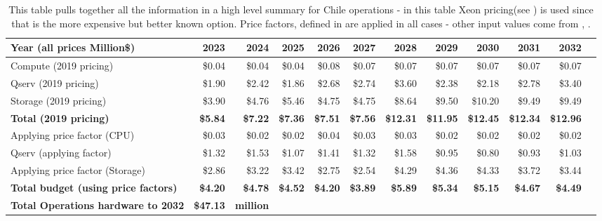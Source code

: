 \tiny \begin{longtable} { |p{}  |r  |r  |r  |r  |r  |r  |r  |r  |r  |r  |r |} 
\caption{This table pulls together all the information in a high level summary for Chile operations - in this table Xeon pricing(see ) is used since that is the more expensive but better known option. Price factors, defined in  are applied in all cases - other input values come from , .
 \label{tab:opsSumChile}}\\ 
\hline 
\textbf{Year  (all prices Million\$)}&\textbf{2023}&\textbf{2024}&\textbf{2025}&\textbf{2026}&\textbf{2027}&\textbf{2028}&\textbf{2029}&\textbf{2030}&\textbf{2031}&\textbf{2032} \\ \hline
{Compute (2019 pricing)}&{\$0.04}&{\$0.04}&{\$0.04}&{\$0.08}&{\$0.07}&{\$0.07}&{\$0.07}&{\$0.07}&{\$0.07}&{\$0.07} \\ \hline
{Qserv (2019 pricing)}&{\$1.90}&{\$2.42}&{\$1.86}&{\$2.68}&{\$2.74}&{\$3.60}&{\$2.38}&{\$2.18}&{\$2.78}&{\$3.40} \\ \hline
{Storage (2019 pricing)}&{\$3.90}&{\$4.76}&{\$5.46}&{\$4.75}&{\$4.75}&{\$8.64}&{\$9.50}&{\$10.20}&{\$9.49}&{\$9.49} \\ \hline
\textbf{Total (2019 pricing)}&\textbf{\$5.84}&\textbf{\$7.22}&\textbf{\$7.36}&\textbf{\$7.51}&\textbf{\$7.56}&\textbf{\$12.31}&\textbf{\$11.95}&\textbf{\$12.45}&\textbf{\$12.34}&\textbf{\$12.96} \\ \hline
{Applying price factor (CPU)}&{\$0.03}&{\$0.02}&{\$0.02}&{\$0.04}&{\$0.03}&{\$0.03}&{\$0.02}&{\$0.02}&{\$0.02}&{\$0.02} \\ \hline
{Qserv (applying factor)}&{\$1.32}&{\$1.53}&{\$1.07}&{\$1.41}&{\$1.32}&{\$1.58}&{\$0.95}&{\$0.80}&{\$0.93}&{\$1.03} \\ \hline
{Applying price factor (Storage)}&{\$2.86}&{\$3.22}&{\$3.42}&{\$2.75}&{\$2.54}&{\$4.29}&{\$4.36}&{\$4.33}&{\$3.72}&{\$3.44} \\ \hline
\textbf{Total budget (using price factors)}&\textbf{\$4.20}&\textbf{\$4.78}&\textbf{\$4.52}&\textbf{\$4.20}&\textbf{\$3.89}&\textbf{\$5.89}&\textbf{\$5.34}&\textbf{\$5.15}&\textbf{\$4.67}&\textbf{\$4.49} \\ \hline
\textbf{Total Operations hardware to 2032 }&\textbf{\$47.13}&\textbf{million}&&&&&&&& \\ \hline
\end{longtable} \normalsize
